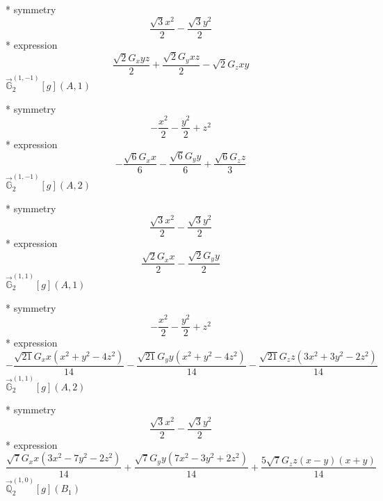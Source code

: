 \documentclass[fleqn,8pt]{jsarticle}
\begin{document}
\noindent\quad ** symmetry
\begin{dmath*}
\frac{\sqrt{3} x^{2}}{2} - \frac{\sqrt{3} y^{2}}{2}
\end{dmath*}
\noindent\quad ** expression
\begin{dmath*}
\frac{\sqrt{2} G_{x} y z}{2} + \frac{\sqrt{2} G_{y} x z}{2} - \sqrt{2} G_{z} x y
\end{dmath*}
\noindent\quad $\vec{\mathbb{G}}_{2}^{(1,-1)}[g](A,1)$

\noindent\quad ** symmetry
\begin{dmath*}
- \frac{x^{2}}{2} - \frac{y^{2}}{2} + z^{2}
\end{dmath*}
\noindent\quad ** expression
\begin{dmath*}
- \frac{\sqrt{6} G_{x} x}{6} - \frac{\sqrt{6} G_{y} y}{6} + \frac{\sqrt{6} G_{z} z}{3}
\end{dmath*}
\noindent\quad $\vec{\mathbb{G}}_{2}^{(1,-1)}[g](A,2)$

\noindent\quad ** symmetry
\begin{dmath*}
\frac{\sqrt{3} x^{2}}{2} - \frac{\sqrt{3} y^{2}}{2}
\end{dmath*}
\noindent\quad ** expression
\begin{dmath*}
\frac{\sqrt{2} G_{x} x}{2} - \frac{\sqrt{2} G_{y} y}{2}
\end{dmath*}
\noindent\quad $\vec{\mathbb{G}}_{2}^{(1,1)}[g](A,1)$

\noindent\quad ** symmetry
\begin{dmath*}
- \frac{x^{2}}{2} - \frac{y^{2}}{2} + z^{2}
\end{dmath*}
\noindent\quad ** expression
\begin{dmath*}
- \frac{\sqrt{21} G_{x} x \left(x^{2} + y^{2} - 4 z^{2}\right)}{14} - \frac{\sqrt{21} G_{y} y \left(x^{2} + y^{2} - 4 z^{2}\right)}{14} - \frac{\sqrt{21} G_{z} z \left(3 x^{2} + 3 y^{2} - 2 z^{2}\right)}{14}
\end{dmath*}
\noindent\quad $\vec{\mathbb{G}}_{2}^{(1,1)}[g](A,2)$

\noindent\quad ** symmetry
\begin{dmath*}
\frac{\sqrt{3} x^{2}}{2} - \frac{\sqrt{3} y^{2}}{2}
\end{dmath*}
\noindent\quad ** expression
\begin{dmath*}
\frac{\sqrt{7} G_{x} x \left(3 x^{2} - 7 y^{2} - 2 z^{2}\right)}{14} + \frac{\sqrt{7} G_{y} y \left(7 x^{2} - 3 y^{2} + 2 z^{2}\right)}{14} + \frac{5 \sqrt{7} G_{z} z \left(x - y\right) \left(x + y\right)}{14}
\end{dmath*}
\noindent\quad $\vec{\mathbb{Q}}_{2}^{(1,0)}[g](B_{1})$
\end{document}

